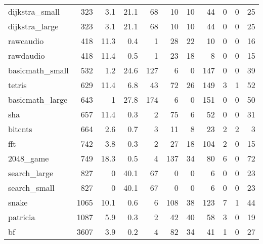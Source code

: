 \begin{tabular}{lrrrrrrrrrr}
 dijkstra\_small  &            323 &      3.1 &   21.1 &   68 &     10 &         10 &           44 &     0 &     0 &    25 \\
 dijkstra\_large  &            323 &      3.1 &   21.1 &   68 &     10 &         10 &           44 &     0 &     0 &    25 \\
 rawcaudio       &            418 &     11.3 &    0.4 &    1 &     28 &         22 &           10 &     0 &     0 &    16 \\
 rawdaudio       &            418 &     11.4 &    0.5 &    1 &     23 &         18 &            8 &     0 &     0 &    15 \\
 basicmath\_small &            532 &      1.2 &   24.6 &  127 &      6 &          0 &          147 &     0 &     0 &    39 \\
 tetris          &            629 &     11.4 &    6.8 &   43 &     72 &         26 &          149 &     3 &     1 &    52 \\
 basicmath\_large &            643 &      1   &   27.8 &  174 &      6 &          0 &          151 &     0 &     0 &    50 \\
 sha             &            657 &     11.4 &    0.3 &    2 &     75 &          6 &           52 &     0 &     0 &    31 \\
 bitcnts         &            664 &      2.6 &    0.7 &    3 &     11 &          8 &           23 &     2 &     2 &     3 \\
 fft             &            742 &      3.8 &    0.3 &    2 &     27 &         18 &          104 &     2 &     0 &    15 \\
 2048\_game       &            749 &     18.3 &    0.5 &    4 &    137 &         34 &           80 &     6 &     0 &    72 \\
 search\_large    &            827 &      0   &   40.1 &   67 &      0 &          0 &            6 &     0 &     0 &    23 \\
 search\_small    &            827 &      0   &   40.1 &   67 &      0 &          0 &            6 &     0 &     0 &    23 \\
 snake           &           1065 &     10.1 &    0.6 &    6 &    108 &         38 &          123 &     7 &     1 &    44 \\
 patricia        &           1087 &      5.9 &    0.3 &    2 &     42 &         40 &           58 &     3 &     0 &    19 \\
 bf              &           3607 &      3.9 &    0.2 &    4 &     82 &         34 &           41 &     1 &     0 &    27 \\

\end{tabular}
